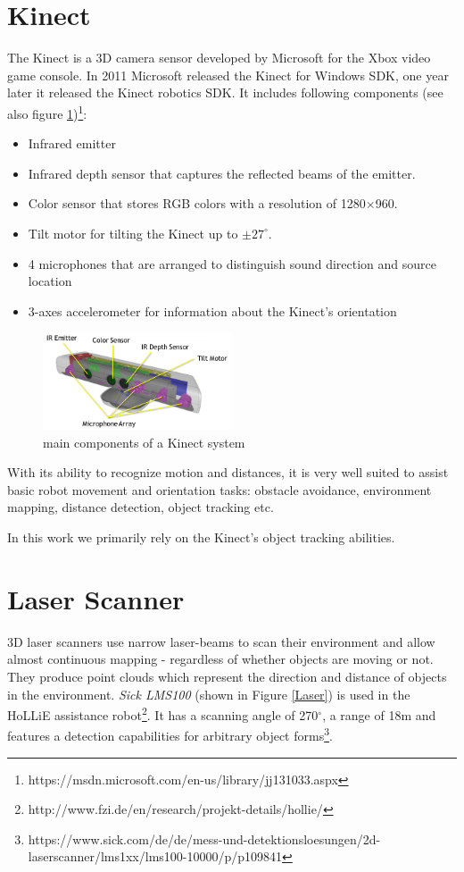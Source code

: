 \section{Kinect}
The Kinect is a 3D camera sensor developed by Microsoft for the Xbox video game console. In 2011 Microsoft released the Kinect for Windows SDK, one year later it released the Kinect robotics SDK. It includes following components (see also figure \ref{Kinect})\footnote{https://msdn.microsoft.com/en-us/library/jj131033.aspx}:

\begin{itemize}
\item Infrared emitter
\item Infrared depth sensor that captures the reflected beams of the emitter.
\item Color sensor that stores RGB colors with a resolution of 1280$\times$960.
\item Tilt motor for tilting the Kinect up to $\pm 27^\circ$.
\item 4 microphones that are arranged to distinguish sound direction and source location
\item 3-axes accelerometer for information about the Kinect's orientation
\end{itemize}

\begin{figure}[ht]
\centering
\includegraphics[width=0.5\textwidth]{graphics/kinect.png}
\caption{main components of a Kinect system}
\label{Kinect}
\centering
\end{figure}

With its ability to recognize motion and distances, it is very well suited to assist basic robot movement and orientation tasks: obstacle avoidance, environment mapping, distance detection, object tracking etc.

In this work we primarily rely on the Kinect's object tracking abilities.
  
\section{Laser Scanner}
3D laser scanners use narrow laser-beams to scan their environment and allow almost continuous mapping - regardless of whether objects are moving or not. They produce point clouds which represent the direction and distance of objects in the environment. \textit{Sick LMS100} (shown in Figure \ref{Laser}) is used in the HoLLiE assistance robot\footnote{http://www.fzi.de/en/research/projekt-details/hollie/}. It has a scanning angle of  270$^\circ$, a range of 18m and features a detection capabilities for arbitrary object forms\footnote{https://www.sick.com/de/de/mess-und-detektionsloesungen/2d-laserscanner/lms1xx/lms100-10000/p/p109841}.

